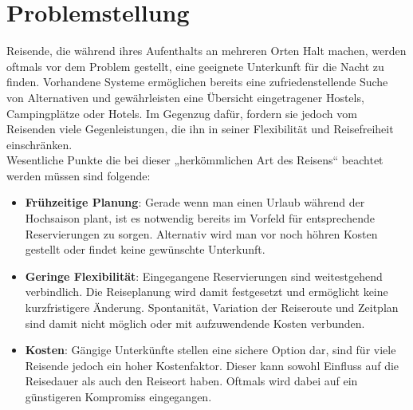 
\section{Problemstellung}
Reisende, die während ihres Aufenthalts an mehreren Orten Halt machen, werden oftmals vor dem Problem gestellt, eine geeignete Unterkunft für die Nacht zu finden. Vorhandene Systeme ermöglichen bereits eine zufriedenstellende Suche von Alternativen und gewährleisten eine Übersicht eingetragener Hostels, Campingplätze oder Hotels. Im Gegenzug dafür, fordern sie jedoch vom Reisenden viele Gegenleistungen, die ihn in seiner Flexibilität und Reisefreiheit einschränken.\\
Wesentliche Punkte die bei dieser „herkömmlichen Art des Reisens“ beachtet werden müssen sind folgende:
\begin{itemize}
   \item \textbf{Frühzeitige Planung}: Gerade wenn man einen Urlaub während der Hochsaison plant, ist es notwendig bereits im Vorfeld für entsprechende Reservierungen zu sorgen. Alternativ wird man vor noch höhren Kosten gestellt oder findet keine gewünschte Unterkunft. 
   \item \textbf{Geringe Flexibilität}: Eingegangene Reservierungen sind weitestgehend verbindlich. Die Reiseplanung wird damit festgesetzt und ermöglicht keine kurzfristigere Änderung. Spontanität, Variation der Reiseroute und Zeitplan sind damit nicht möglich oder mit aufzuwendende Kosten verbunden. 
   \item \textbf{Kosten}: Gängige Unterkünfte stellen eine sichere Option dar, sind für viele Reisende jedoch ein hoher Kostenfaktor. Dieser kann sowohl Einfluss auf die Reisedauer als auch den Reiseort haben. Oftmals wird dabei auf ein günstigeren Kompromiss eingegangen. 

\end{itemize}

